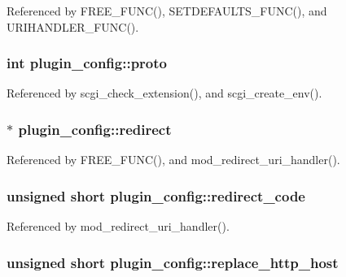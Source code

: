 Referenced by F\-R\-E\-E\-\_\-\-F\-U\-N\-C(), S\-E\-T\-D\-E\-F\-A\-U\-L\-T\-S\-\_\-\-F\-U\-N\-C(), and U\-R\-I\-H\-A\-N\-D\-L\-E\-R\-\_\-\-F\-U\-N\-C().

\hypertarget{structplugin__config_ae093b0f5f57a6acbb633eadf59b43302}{
\subsubsection[{proto}]{\setlength{\rightskip}{0pt plus 5cm}int plugin\-\_\-config\-::proto}}\label{structplugin__config_ae093b0f5f57a6acbb633eadf59b43302}


Referenced by scgi\-\_\-check\-\_\-extension(), and scgi\-\_\-create\-\_\-env().

\hypertarget{structplugin__config_a02dd868b2860bc543c281ce27a347b77}{
\subsubsection[{redirect}]{$\ast$ plugin\-\_\-config\-::redirect}}\label{structplugin__config_a02dd868b2860bc543c281ce27a347b77}


Referenced by F\-R\-E\-E\-\_\-\-F\-U\-N\-C(), and mod\-\_\-redirect\-\_\-uri\-\_\-handler().

\hypertarget{structplugin__config_aa64d0c0d3295ca55475831bdba40bec9}{
\subsubsection[{redirect\-\_\-code}]{\setlength{\rightskip}{0pt plus 5cm}unsigned short plugin\-\_\-config\-::redirect\-\_\-code}}\label{structplugin__config_aa64d0c0d3295ca55475831bdba40bec9}


Referenced by mod\-\_\-redirect\-\_\-uri\-\_\-handler().

\hypertarget{structplugin__config_a5502e9aed30651a49b875337ec244ea6}{
\subsubsection[{replace\-\_\-http\-\_\-host}]{\setlength{\rightskip}{0pt plus 5cm}unsigned short plugin\-\_\-config\-::replace\-\_\-http\-\_\-host}}\label{structplugin__config_a5502e9aed30651a49b875337ec244ea6}


